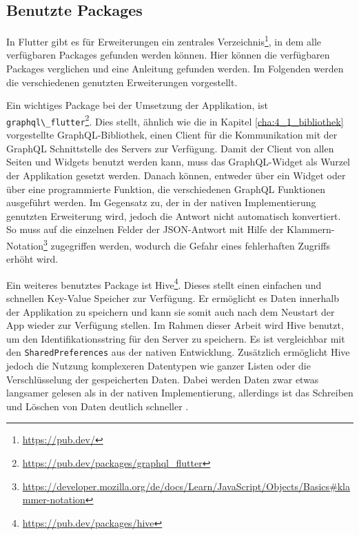 \subsection{Benutzte Packages}
\label{cha:4_3_2}
In Flutter gibt es für Erweiterungen ein zentrales Verzeichnis\footnote{\url{https://pub.dev/}}, in dem alle verfügbaren Packages gefunden werden können. Hier können die verfügbaren Packages verglichen und eine Anleitung gefunden werden. Im Folgenden werden die verschiedenen genutzten Erweiterungen vorgestellt.

Ein wichtiges Package bei der Umsetzung der Applikation, ist \verb|graphql\_flutter|\footnote{\url{https://pub.dev/packages/graphql\_flutter}}. 
Dies stellt, ähnlich wie die in Kapitel \ref{cha:4_1_bibliothek} vorgestellte GraphQL-Bibliothek, einen Client für die Kommunikation mit der GraphQL Schnittstelle des Servers zur Verfügung.
Damit der Client von allen Seiten und Widgets benutzt werden kann, muss das GraphQL-Widget als Wurzel der Applikation gesetzt werden. Danach können, entweder über ein Widget oder über eine programmierte Funktion, die verschiedenen GraphQL Funktionen ausgeführt werden. 
Im Gegensatz zu, der in der nativen Implementierung genutzten Erweiterung wird, jedoch die Antwort nicht automatisch konvertiert. So muss auf die einzelnen Felder der JSON-Antwort mit Hilfe der Klammern-Notation\footnote{\url{https://developer.mozilla.org/de/docs/Learn/JavaScript/Objects/Basics\#klammer-notation}} zugegriffen werden, wodurch die Gefahr eines fehlerhaften Zugriffs erhöht wird.

Ein weiteres benutztes Package ist Hive\footnote{\url{https://pub.dev/packages/hive}}. Dieses stellt einen einfachen und schnellen Key-Value Speicher zur Verfügung. Er ermöglicht es Daten innerhalb der Applikation zu speichern und kann sie somit auch nach dem Neustart der App wieder zur Verfügung stellen. Im Rahmen dieser Arbeit wird Hive benutzt, um den Identifikationsstring für den Server zu speichern. Es ist vergleichbar mit den \verb|SharedPreferences| aus der nativen Entwicklung. Zusätzlich ermöglicht Hive jedoch die Nutzung komplexeren Datentypen wie ganzer Listen oder die Verschlüsselung der gespeicherten Daten. Dabei werden Daten zwar etwas langsamer gelesen als in der nativen Implementierung, allerdings ist das Schreiben und Löschen von Daten deutlich schneller \cite{hive_vs_sharedPrefernces}.

